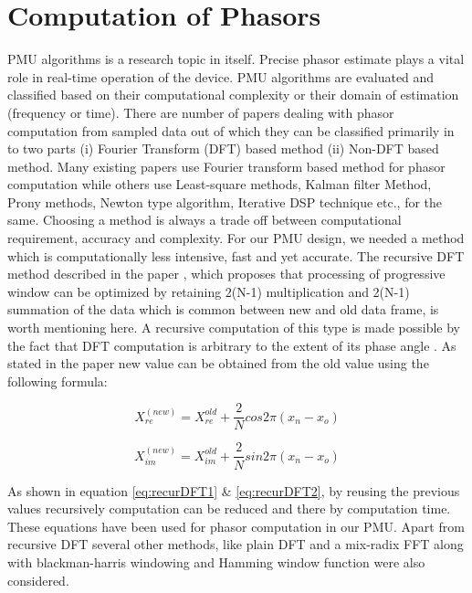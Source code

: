  \section{Computation of Phasors}
 PMU algorithms is a research topic in itself. Precise phasor estimate plays a vital role in real-time operation of the device. PMU algorithms are evaluated and classified based on their computational complexity or their domain of estimation (frequency or time). There are number of papers dealing with phasor computation from sampled data out of which they can be classified primarily in to two parts (i) Fourier Transform (DFT) based method (ii) Non-DFT based method. Many existing papers use Fourier transform based method for phasor computation while others use Least-square methods, Kalman filter Method, Prony methods, Newton type algorithm, Iterative DSP technique etc., for the same. Choosing a method is always a trade off between computational requirement, accuracy and complexity. For our PMU design, we needed a method which is computationally less intensive, fast and yet accurate. The recursive DFT method described in the paper \cite{phadke1983new}, which proposes that processing of progressive window can be optimized by retaining 2(N-1) multiplication and 2(N-1) summation of the data which is common between new and old data frame, is worth mentioning here. A recursive computation of this type is made possible by the fact that DFT computation is arbitrary to the extent of its phase angle \cite{phadke1983new}. As stated in the paper new value can be obtained from the old value using the following formula:
 
 \begin{equation}
 X_{re}^{(new)} = X_{re}^{old} + \frac{2}{N}cos 2\pi(x_{n} - x_{o})
 \label{eq:recurDFT1}
 \end{equation} 
 
 \begin{equation}
 X_{im}^{(new)} = X_{im}^{old} + \frac{2}{N}sin 2\pi(x_{n} - x_{o})
 \label{eq:recurDFT2}
 \end{equation}
 
 As shown in equation \ref{eq:recurDFT1} \& \ref{eq:recurDFT2}, by reusing the previous values recursively computation can be reduced and there by computation time. These equations have been used for phasor computation in our PMU. Apart from recursive DFT several other methods, like plain DFT and a mix-radix FFT \cite{kissFFT} along with blackman-harris windowing and Hamming window function were also considered. 
 
